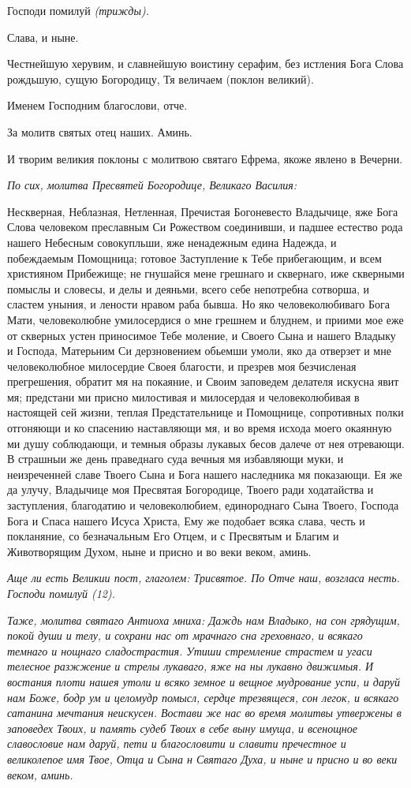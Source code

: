 Господи помилуй \itshape (трижды)\normalfont{}.


Слава, и ныне.


Честнейшую херувим, и славнейшую воистину серафим, без истления Бога Слова рождьшую, сущую Богородицу, Тя величаем (поклон великий).


Именем Господним благослови, отче.


За молитв святых отец наших. Аминь.


И творим великия поклоны с молитвою святаго Ефрема, якоже явлено в Вечерни.


\itshape По сих, молитва Пресвятей Богородице, Великаго Василия:\normalfont{}


Нескверная, Неблазная, Нетленная, Пречистая Богоневесто Владычице, яже Бога Слова человеком преславным Си Рожеством соединивши, и падшее естество рода нашего Небесным совокупльши, яже ненадежным едина Надежда, и побеждаемым Помощница; готовое Заступление к Тебе прибегающим, и всем християном Прибежище; не гнушайся мене грешнаго и сквернаго, иже скверными помыслы и словесы, и делы и деяньми, всего себе непотребна сотворша, и сластем уныния, и лености нравом раба бывша. Но яко человеколюбиваго Бога Мати, человеколюбне умилосердися о мне грешнем и блуднем, и приими мое еже от скверных устен приносимое Тебе моление, и Своего Сына и нашего Владыку и Господа, Матерьним Си дерзновением обьемши умоли, яко да отверзет и мне человеколюбное милосердие Своея благости, и презрев моя безчисленая прегрешения, обратит мя на покаяние, и Своим заповедем делателя искусна явит мя; предстани ми присно милостивая и милосердая и человеколюбивая в настоящей сей жизни, теплая Предстательнице и Помощнице, сопротивных полки отгоняющи и ко спасению наставляющи мя, и во время исхода моего окаянную ми душу соблюдающи, и темныя образы лукавых бесов далече от нея отревающи. В страшныи же день праведнаго суда вечныя мя избавляющи муки, и неизреченней славе Твоего Сына и Бога нашего наследника мя показающи. Ея же да улучу, Владычице моя Пресвятая Богородице, Твоего ради ходатайства и заступления, благодатию и человеколюбием, единороднаго Сына Твоего, Господа Бога и Спаса нашего Исуса Христа, Ему же подобает всяка слава, честь и покланяние, со безначальным Его Отцем, и с Пресвятым и Благим и Животворящим Духом, ныне и присно и во веки веком, аминь.


\itshape Аще ли есть Великии пост, глаголем:\normalfont{} Трисвятое. По Отче наш, возгласа несть. Господи помилуй (12).


\itshape Таже, молитва святаго Антиоха мниха:\normalfont{} Даждь нам Владыко, на сон грядущим, покой души и телу, и сохрани нас от мрачнаго сна греховнаго, и всякаго темнаго и нощнаго сладострастия. Утиши стремление страстем и угаси телесное разжжение и стрелы лукаваго, яже на ны лукавно движимыя. И востания плоти нашея утоли и всяко земное и вещное мудрование успи, и даруй нам Боже, бодр ум и целомудр помысл, сердце трезвящеся, сон легок, и всякаго сатанина мечтания неискусен. Востави же нас во время молитвы утвержены в заповедех Твоих, и память судеб Твоих в себе выну имуща, и всенощное славословие нам даруй, пети и благословити и славити пречестное и великолепое имя Твое, Отца и Сына н Святаго Духа, и ныне и присно и во веки веком, аминь.



